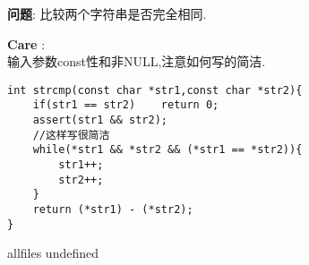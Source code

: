\documentclass{article}
\begin{document}
\begin{CJK}{UTF8}{gbsn}     %

\else
    
\begin{description}
    \item{\textbf{问题}}: 比较两个字符串是否完全相同.
    \item{\textbf{Care}} : 
	\\输入参数const性和非NULL,注意如何写的简洁.
    \begin{lstlisting}
int strcmp(const char *str1,const char *str2){
	if(str1 == str2)	return 0;
	assert(str1 && str2);
	//这样写很简洁
	while(*str1 && *str2 && (*str1 == *str2)){
		str1++;
		str2++;
	}
	return (*str1) - (*str2);
}
    \end{lstlisting}
\end{description}

\fi

\ifx allfiles undefined
\end{CJK}
\end{document}
